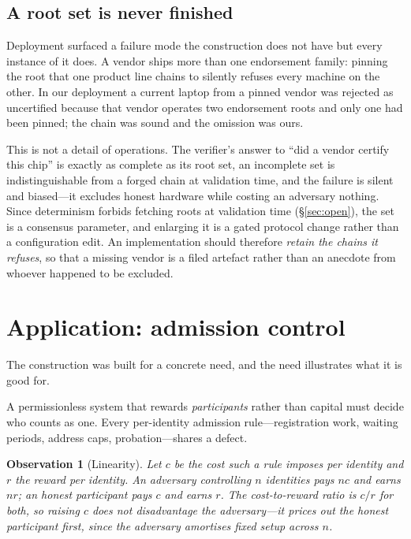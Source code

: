 \documentclass[conference,10pt]{IEEEtran}
\newtheorem{observation}{Observation}
\begin{document}
\subsection{A root set is never finished}

Deployment surfaced a failure mode the construction does not have but every instance of it does. A vendor
ships more than one endorsement family: pinning the root that one product line chains to silently refuses
every machine on the other. In our deployment a current laptop from a pinned vendor was rejected as
uncertified because that vendor operates two endorsement roots and only one had been pinned; the chain was
sound and the omission was ours.

This is not a detail of operations. The verifier's answer to ``did a vendor certify this chip'' is exactly
as complete as its root set, an incomplete set is indistinguishable from a forged chain at validation
time, and the failure is silent and biased---it excludes honest hardware while costing an adversary
nothing. Since determinism forbids fetching roots at validation time (\S\ref{sec:open}), the set is a
consensus parameter, and enlarging it is a gated protocol change rather than a configuration edit. An
implementation should therefore \emph{retain the chains it refuses}, so that a missing vendor is a filed
artefact rather than an anecdote from whoever happened to be excluded.

\section{Application: admission control}
\label{sec:application}

The construction was built for a concrete need, and the need illustrates what it is good for.

A permissionless system that rewards \emph{participants} rather than capital must decide who counts as
one. Every per-identity admission rule---registration work, waiting periods, address caps,
probation---shares a defect.

\begin{observation}[Linearity]
\label{obs:linearity}
Let $c$ be the cost such a rule imposes per identity and $r$ the reward per identity. An adversary
controlling $n$ identities pays $nc$ and earns $nr$; an honest participant pays $c$ and earns $r$. The
cost-to-reward ratio is $c/r$ for both, so raising $c$ does not disadvantage the adversary---it prices
out the honest participant first, since the adversary amortises fixed setup across $n$.
\end{observation}
\end{document}
